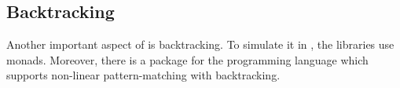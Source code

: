 \documentclass[thesis-solanki.tex]{subfiles}
\begin{document}
\subsection{Backtracking}

Another important aspect of  is backtracking. To simulate it in , the libraries \cite{stream-monad-lib, logicst-lib} use monads. Moreover, there is a package for the  programming language \cite{egison-lib} which supports non-linear pattern-matching with backtracking.

\begin{comment}

\begin{enumerate}
	\item Egison \cite{egison-lib}
	\item stream-monad \cite{stream-monad-lib}
	\item logicst \cite{logicst-lib}
\end{enumerate}

\end{comment}


\begin{comment}
\section{Possibly Related Content}
\begin{enumerate}

\item Unifying Theories of Programming, C.A.R. Hoare,
\\* \url{http://www.unifyingtheories.org/}

\item Unifying Theories of Programming with Monads, Jeremy Gibbons,
\\* \url{http://www.cs.ox.ac.uk/people/jeremy.gibbons/publications/utp-monads.pdf}

\end{enumerate}
\end{comment}
\end{document}

